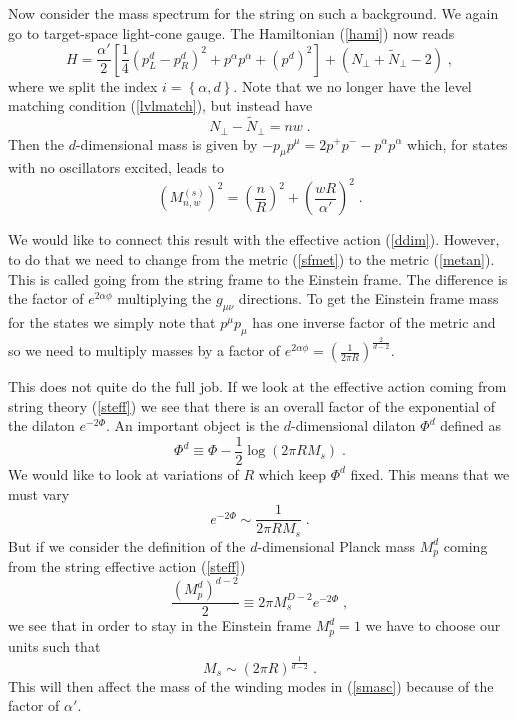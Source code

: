 \documentclass[11pt,a4paper]{article}
\numberwithin{equation}{section}
\numberwithin{table}{section}\setlength{\multlinegap}{25pt}
\newcommand{\bea}{\begin{eqnarray}}  \newcommand{\eea}{\end{eqnarray}}
\newcommand{\be}{\begin{equation}}
\newcommand{\ee}{\end{equation}}
\begin{document}
Now consider the mass spectrum for the string on such a background. We again go to target-space light-cone gauge. The Hamiltonian (\ref{hami}) now reads
\be
H = \frac{\alpha'}{2} \left[ \frac14 \left(p_L^d - p_R^d\right)^2 + p^{\alpha} p^{\alpha} + \left( p^d\right)^2 \right] + \left(N_{\perp} + \tilde{N}_{\perp} - 2 \right)  \;,
\ee
where we split the index $i =\left\{\alpha,d\right\}$.
Note that we no longer have the level matching condition (\ref{lvlmatch}), but instead have
\be
N_{\perp} - \tilde{N}_{\perp} = n w\;.
\ee
Then the $d$-dimensional mass is given by $-p_{\mu} p^{\mu} = 2p^+ p^- -p^{\alpha} p^{\alpha}$ which, for states with no oscillators excited, leads to 
\be
\left(M^{(s)}_{n,w}\right)^2 = \left(\frac{n}{R}\right)^2 + \left(\frac{w R}{\alpha'}\right)^2 \;.
\label{smasc}
\ee

We would like to connect this result with the effective action (\ref{ddim}). However, to do that we need to change from the metric (\ref{sfmet}) to the metric (\ref{metan}). This is called going from the string frame to the Einstein frame. The difference is the factor of $e^{2 \alpha \phi}$ multiplying the $g_{\mu\nu}$ directions. To get the Einstein frame mass for the states we simply note that $p^{\mu}p_{\mu}$ has one inverse factor of the metric and so we need to multiply masses by a factor of $e^{2 \alpha \phi} = \left(\frac{1}{2\pi R}\right)^{\frac{2}{d-2}}$. 

This does not quite do the full job. If we look at the effective action coming from string theory (\ref{steff}) we see that there is an overall factor of the exponential of the dilaton $e^{-2\Phi}$. An important object is the $d$-dimensional dilaton $\Phi^d$ defined as
\be
\Phi^d \equiv \Phi - \frac12 \log \left(2 \pi R M_s \right)\;.
\ee
We would like to look at variations of $R$ which keep $\Phi^d$ fixed. This means that we must vary 
\be
e^{-2\Phi} \sim \frac{1}{2 \pi R M_s} \;.
\ee
But if we consider the definition of the $d$-dimensional Planck mass $M_p^d$ coming from the string effective action (\ref{steff}) 
\be
\label{mpmsdire}
\frac{\left(M_p^d\right)^{d-2}}{2} \equiv 2\pi M_s^{D-2} e^{-2\Phi} \;,
\ee
we see that in order to stay in the Einstein frame $M_p^d=1$ we have to choose our units such that 
\be
M_s \sim \left( 2 \pi R \right)^{\frac{1}{d-2}} \;.
\label{MsR}
\ee
This will then affect the mass of the winding modes in (\ref{smasc}) because of the factor of $\alpha'$.
\end{document}
